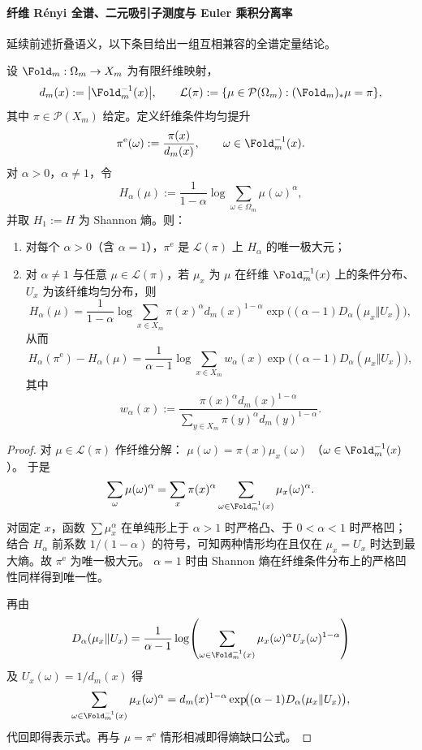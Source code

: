 \paragraph{纤维 Rényi 全谱、二元吸引子测度与 Euler 乘积分离率}
延续前述折叠语义，以下条目给出一组互相兼容的全谱定量结论。

\begin{theorem}\label{thm:xi-time-part9g-renyi-maximizer-fiber-uniform}
设 \(\Fold_m:\Omega_m\to X_m\) 为有限纤维映射，
\[
d_m(x):=\bigl|\Fold_m^{-1}(x)\bigr|,\qquad
\mathcal L(\pi):=\{\mu\in\mathcal P(\Omega_m):(\Fold_m)_{\ast}\mu=\pi\},
\]
其中 \(\pi\in\mathcal P(X_m)\) 给定。定义纤维条件均匀提升
\[
\pi^{\mathrm e}(\omega):=\frac{\pi(x)}{d_m(x)},
\qquad \omega\in \Fold_m^{-1}(x).
\]
对 \(\alpha>0\)，\(\alpha\neq 1\)，令
\[
H_\alpha(\mu):=\frac{1}{1-\alpha}\log\sum_{\omega\in\Omega_m}\mu(\omega)^\alpha,
\]
并取 \(H_1:=H\) 为 Shannon 熵。则：
\begin{enumerate}
  \item 对每个 \(\alpha>0\)（含 \(\alpha=1\)），\(\pi^{\mathrm e}\) 是 \(\mathcal L(\pi)\) 上 \(H_\alpha\) 的唯一极大元；
  \item 对 \(\alpha\neq 1\) 与任意 \(\mu\in\mathcal L(\pi)\)，若 \(\mu_x\) 为 \(\mu\) 在纤维 \(\Fold_m^{-1}(x)\) 上的条件分布、\(U_x\) 为该纤维均匀分布，则
  \[
  H_\alpha(\mu)
  =\frac{1}{1-\alpha}
  \log\!\sum_{x\in X_m}
  \pi(x)^\alpha d_m(x)^{1-\alpha}
  \exp\!\bigl((\alpha-1)D_\alpha(\mu_x\Vert U_x)\bigr),
  \]
  从而
  \[
  H_\alpha(\pi^{\mathrm e})-H_\alpha(\mu)
  =\frac{1}{\alpha-1}
  \log\!\sum_{x\in X_m}
  w_\alpha(x)\exp\!\bigl((\alpha-1)D_\alpha(\mu_x\Vert U_x)\bigr),
  \]
  其中
  \[
  w_\alpha(x):=
  \frac{\pi(x)^\alpha d_m(x)^{1-\alpha}}
  {\sum_{y\in X_m}\pi(y)^\alpha d_m(y)^{1-\alpha}}.
  \]
\end{enumerate}
\end{theorem}
\begin{proof}
对 \(\mu\in\mathcal L(\pi)\) 作纤维分解：
\(
\mu(\omega)=\pi(x)\mu_x(\omega)
\)
（\(\omega\in\Fold_m^{-1}(x)\)）。
于是
\[
\sum_{\omega}\mu(\omega)^\alpha
=\sum_{x}\pi(x)^\alpha\sum_{\omega\in\Fold_m^{-1}(x)}\mu_x(\omega)^\alpha.
\]
对固定 \(x\)，函数 \(\sum \mu_x^\alpha\) 在单纯形上于 \(\alpha>1\) 时严格凸、于 \(0<\alpha<1\) 时严格凹；结合 \(H_\alpha\) 前系数 \(1/(1-\alpha)\) 的符号，可知两种情形均在且仅在 \(\mu_x=U_x\) 时达到最大熵。故 \(\pi^{\mathrm e}\) 为唯一极大元。 \(\alpha=1\) 时由 Shannon 熵在纤维条件分布上的严格凹性同样得到唯一性。

再由
\[
D_\alpha(\mu_x\Vert U_x)
=\frac{1}{\alpha-1}
\log\!\left(
\sum_{\omega\in\Fold_m^{-1}(x)}
\mu_x(\omega)^\alpha U_x(\omega)^{1-\alpha}
\right)
\]
及 \(U_x(\omega)=1/d_m(x)\) 得
\[
\sum_{\omega\in\Fold_m^{-1}(x)}\mu_x(\omega)^\alpha
=d_m(x)^{1-\alpha}\exp\!\bigl((\alpha-1)D_\alpha(\mu_x\Vert U_x)\bigr),
\]
代回即得表示式。再与 \(\mu=\pi^{\mathrm e}\) 情形相减即得熵缺口公式。
\end{proof}

